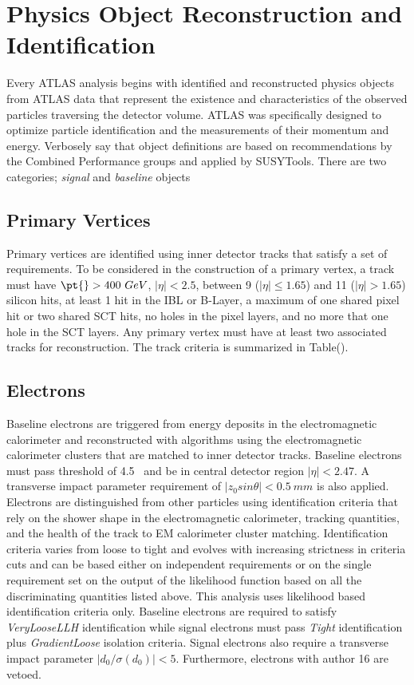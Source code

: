 \chapter{Physics Object Reconstruction and Identification}
Every ATLAS analysis begins with identified and reconstructed physics objects from ATLAS data that represent the existence and characteristics of the observed particles traversing the detector volume.
 ATLAS was specifically designed to optimize particle identification and the measurements of their momentum and energy.
Verbosely say that object definitions are based on recommendations by the Combined Performance groups and applied by SUSYTools. 
 There are two categories; \textit{signal} and \textit{baseline} objects

\section{Primary Vertices}
Primary vertices are identified using inner detector tracks that satisfy a set of requirements.  To be considered in the construction of a primary vertex, a track must have $ \pt{} > 400~GeV$, $|\eta| < 2.5$, between 9 ($|\eta| \leq 1.65$) and 11 ($|\eta| > 1.65$) silicon hits, at least 1 hit in the IBL or B-Layer, a maximum of one shared pixel hit or two shared SCT hits, no holes in the pixel layers, and no more that one hole in the SCT layers.  Any primary vertex must have at least two associated tracks for reconstruction.  The track criteria is summarized in Table().

\section{Electrons}
Baseline electrons are triggered from energy deposits in the electromagnetic calorimeter and reconstructed with algorithms using the electromagnetic calorimeter clusters that are matched to inner detector tracks.  Baseline electrons must pass \pt{} threshold of 4.5 ~\GeV and be in central detector region $|\eta | < 2.47$.  A transverse impact parameter requirement of $|z_0sin\theta| < 0.5~mm$ is also applied.  Electrons are distinguished from other particles using identification criteria that rely on the shower shape in the electromagnetic calorimeter, tracking quantities, and the health of the track to EM calorimeter cluster matching.  Identification criteria varies from loose to tight and evolves with increasing strictness in criteria cuts and can be based either on independent requirements or on the single requirement set on the output of the likelihood function based on all the discriminating quantities listed above.  This analysis uses likelihood based identification criteria only.  Baseline electrons are required to satisfy \textit{VeryLooseLLH} identification while signal electrons must pass  \textit{Tight} identification plus \textit{GradientLoose} isolation criteria.  Signal electrons also require a transverse impact parameter $|d_0/\sigma(d_0)| < 5$. Furthermore, electrons with author 16 are vetoed.  

